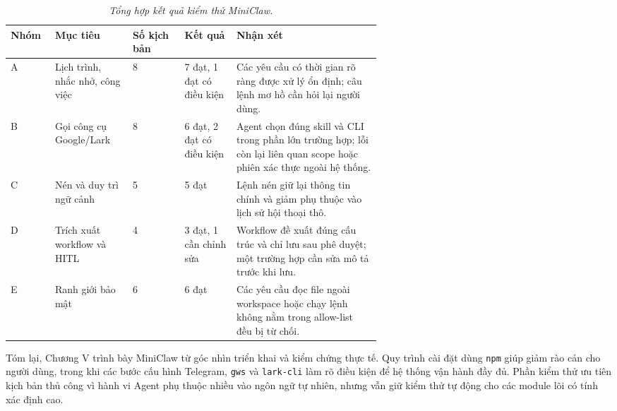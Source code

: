 \begin{table}[H]
  \centering
  \caption{\emph{Tổng hợp kết quả kiểm thử MiniClaw.}}
  \label{tab:evaluation-summary}
  \small
  \begin{tabularx}{\linewidth}{|p{0.12\linewidth}|p{0.21\linewidth}|p{0.14\linewidth}|p{0.14\linewidth}|X|}
    \hline
    \textbf{Nhóm} & \textbf{Mục tiêu} & \textbf{Số kịch bản} & \textbf{Kết quả} & \textbf{Nhận xét} \\
    \hline
    A & Lịch trình, nhắc nhở, công việc & 8 & 7 đạt, 1 đạt có điều kiện & Các yêu cầu có thời gian rõ ràng được xử lý ổn định; câu lệnh mơ hồ cần hỏi lại người dùng. \\
    \hline
    B & Gọi công cụ Google/Lark & 8 & 6 đạt, 2 đạt có điều kiện & Agent chọn đúng skill và CLI trong phần lớn trường hợp; lỗi còn lại liên quan scope hoặc phiên xác thực ngoài hệ thống. \\
    \hline
    C & Nén và duy trì ngữ cảnh & 5 & 5 đạt & Lệnh nén giữ lại thông tin chính và giảm phụ thuộc vào lịch sử hội thoại thô. \\
    \hline
    D & Trích xuất workflow và HITL & 4 & 3 đạt, 1 cần chỉnh sửa & Workflow đề xuất đúng cấu trúc và chỉ lưu sau phê duyệt; một trường hợp cần sửa mô tả trước khi lưu. \\
    \hline
    E & Ranh giới bảo mật & 6 & 6 đạt & Các yêu cầu đọc file ngoài workspace hoặc chạy lệnh không nằm trong allow-list đều bị từ chối. \\
    \hline
  \end{tabularx}
\end{table}

Tóm lại, Chương V trình bày MiniClaw từ góc nhìn triển khai và kiểm chứng thực tế. Quy trình cài đặt dùng \texttt{npm} giúp giảm rào cản cho người dùng, trong khi các bước cấu hình Telegram, \texttt{gws} và \texttt{lark-cli} làm rõ điều kiện để hệ thống vận hành đầy đủ. Phần kiểm thử ưu tiên kịch bản thủ công vì hành vi Agent phụ thuộc nhiều vào ngôn ngữ tự nhiên, nhưng vẫn giữ kiểm thử tự động cho các module lõi có tính xác định cao.
